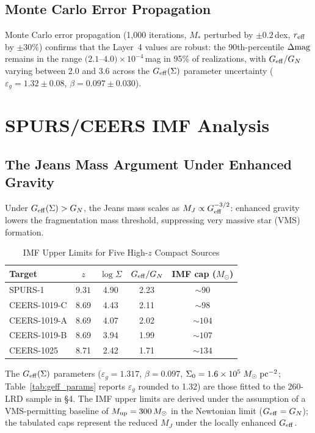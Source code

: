 \documentclass[apj,twocolumn,longbibliography,linenumbers]{aastex701}
\begin{document}
\subsection{Monte Carlo Error Propagation}

Monte Carlo error propagation (1,000 iterations, $M_*$ perturbed by $\pm 0.2$\,dex, $r_{\rm eff}$ by $\pm 30\%$) confirms that the Layer~4 values are robust: the 90th-percentile $\Delta{\rm mag}$ remains in the range $(2.1$--$4.0) \times 10^{-4}$\,mag in 95\% of realizations, with $G_{\rm eff}/G_N$ varying between 2.0 and 3.6 across the $G_{\rm eff}(\Sigma)$ parameter uncertainty ($\varepsilon_g = 1.32 \pm 0.08$, $\beta = 0.097 \pm 0.030$).

\section{SPURS/CEERS IMF Analysis}

\subsection{The Jeans Mass Argument Under Enhanced Gravity}

Under $G_{\rm eff}(\Sigma) > G_N$, the Jeans mass scales as $M_J \propto G_{\rm eff}^{-3/2}$: enhanced gravity lowers the fragmentation mass threshold, suppressing very massive star (VMS) formation.

\begin{table}[h]
\caption{IMF Upper Limits for Five High-$z$ Compact Sources}
\label{tab:imf_limits}
\centering
\footnotesize
\begin{tabular}{lcccc}
\hline
Target & $z$ & $\log\Sigma$ & $G_{\rm eff}/G_N$ & IMF cap ($M_\odot$) \\
\hline
SPURS-1 & $9.31$ & 4.90 & 2.23 & $\sim 90$ \\
CEERS-1019-C & 8.69 & 4.43 & 2.11 & $\sim 98$ \\
CEERS-1019-A & 8.69 & 4.07 & 2.02 & $\sim 104$ \\
CEERS-1019-B & 8.69 & 3.94 & 1.99 & $\sim 107$ \\
CEERS-1025 & 8.71 & 2.42 & 1.71 & $\sim 134$ \\
\hline
\end{tabular}
\end{table}

The $G_{\rm eff}(\Sigma)$ parameters ($\varepsilon_g = 1.317$, $\beta = 0.097$, $\Sigma_0 = 1.6 \times 10^5\;M_\odot\;{\rm pc}^{-2}$; Table~\ref{tab:geff_params} reports $\varepsilon_g$ rounded to 1.32) are those fitted to the 260-LRD sample in \S4. The IMF upper limits are derived under the assumption of a VMS-permitting baseline of $M_{\rm up} = 300\,M_\odot$ in the Newtonian limit ($G_{\rm eff} = G_N$); the tabulated caps represent the reduced $M_J$ under the locally enhanced $G_{\rm eff}$.
\end{document}
